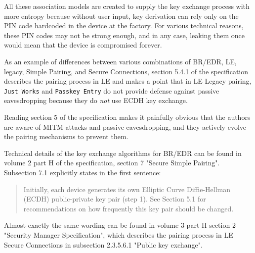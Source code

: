 All these association models are created to supply the key exchange process with more entropy because without user input, key derivation can rely only on the PIN code hardcoded in the device at the factory.
For various technical reasons, these PIN codes may not be strong enough, and in any case, leaking them once would mean that the device is compromised forever.

As an example of differences between various combinations of BR/EDR, LE, legacy, Simple Pairing, and Secure Connections, section 5.4.1 of the specification describes the pairing process in LE and makes a point that in LE Legacy pairing, \texttt{Just Works} and \texttt{Passkey Entry} do not provide defense against passive eavesdropping because they do \textit{not} use ECDH key exchange.

Reading section 5 of the specification makes it painfully obvious that the authors are aware of MITM attacks and passive eavesdropping, and they actively evolve the pairing mechanisms to prevent them.

Technical details of the key exchange algorithms for BR/EDR can be found in volume 2 part H of the specification, section 7 "Secure Simple Pairing".
Subsection 7.1 explicitly states in the first sentence:

\begin{quote}
    Initially, each device generates its own Elliptic Curve Diffie-Hellman (ECDH) public-private key pair (step 1).
    See Section 5.1 for recommendations on how frequently this key pair should be changed.
\end{quote}

Almost exactly the same wording can be found in volume 3 part H section 2 "Security Manager Specification", which describes the pairing process in LE Secure Connections in subsection 2.3.5.6.1 "Public key exchange".